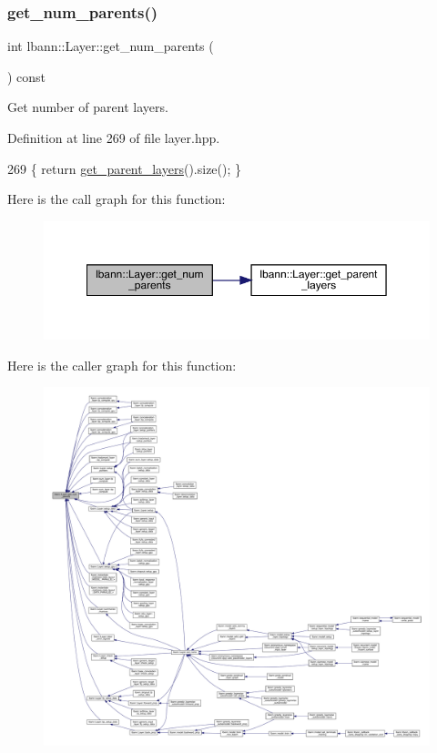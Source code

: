 \subsubsection{\texorpdfstring{get\+\_\+num\+\_\+parents()}{get\_num\_parents()}}
{\footnotesize\ttfamily int lbann\+::\+Layer\+::get\+\_\+num\+\_\+parents (\begin{DoxyParamCaption}{ }\end{DoxyParamCaption}) const\hspace{0.3cm}{\ttfamily [inline]}}

Get number of parent layers. 

Definition at line 269 of file layer.\+hpp.


\begin{DoxyCode}
269 \{ \textcolor{keywordflow}{return} \hyperlink{classlbann_1_1Layer_a898e72b93752abf52d35b06459cd360e}{get\_parent\_layers}().size(); \}
\end{DoxyCode}
Here is the call graph for this function\+:\nopagebreak
\begin{figure}[H]
\begin{center}
\leavevmode
\includegraphics[width=350pt]{classlbann_1_1Layer_ac9290d4a6453ccda5f6b4d8b57b49ba3_cgraph}
\end{center}
\end{figure}
Here is the caller graph for this function\+:\nopagebreak
\begin{figure}[H]
\begin{center}
\leavevmode
\includegraphics[width=350pt]{classlbann_1_1Layer_ac9290d4a6453ccda5f6b4d8b57b49ba3_icgraph}
\end{center}
\end{figure}
